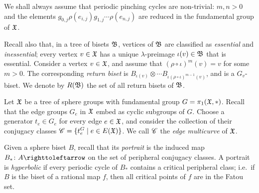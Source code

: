\documentclass{amsart}
\begin{document}
We shall always assume that periodic pinching cycles are non-trivial:
$m,n>0$ and the elements
$g_{0,j}\rho(e_{i,j})g_{1,j}\cdots\rho(e_{n,j})$ are reduced in the
fundamental group of ${\mathfrak X}$.

Recall also that, in a tree of bisets ${\mathfrak B}$, vertices of
${\mathfrak B}$ are classified as \emph{essential} and
\emph{inessential}; every vertex $v\in{\mathfrak X}$ has a unique
$\lambda$-preimage $\iota(v)\in{\mathfrak B}$ that is
essential. Consider a vertex $v\in{\mathfrak X}$, and assume that
$(\rho\circ\iota)^m(v)=v$ for some $m>0$. The corresponding
\emph{return biset} is
$B_{\iota(v)}\otimes\cdots B_{\iota(\rho\circ\iota)^{m-1}(v)}$, and is
a $G_v$-biset. We denote by $R({\mathfrak B})$ the set of all return
bisets of ${\mathfrak B}$.

Let ${\mathfrak X}$ be a tree of sphere groups with fundamental group
$G=\pi_1({\mathfrak X},*)$. Recall that the edge groups $G_e$ in ${\mathfrak X}$ embed as
cyclic subgroups of $G$. Choose a generator $t_e\in G_e$ for every
edge $e\in{\mathfrak X}$, and consider the collection of their conjugacy classes
${\mathscr C}=\{t_e^G\mid e\in E({\mathfrak X})\}$.  We call ${\mathscr C}$ the \emph{edge
  multicurve} of ${\mathfrak X}$.

Given a sphere biset $B$, recall that its \emph{portrait} is the
induced map $B_*\colon A\selfmap$ on the set of peripheral conjugacy
classes. A portrait is \emph{hyperbolic} if every periodic cycle of
$B_*$ contains a critical peripheral class; i.e.~if $B$ is the biset
of a rational map $f$, then all critical points of $f$ are in the
Fatou set.
\end{document}
